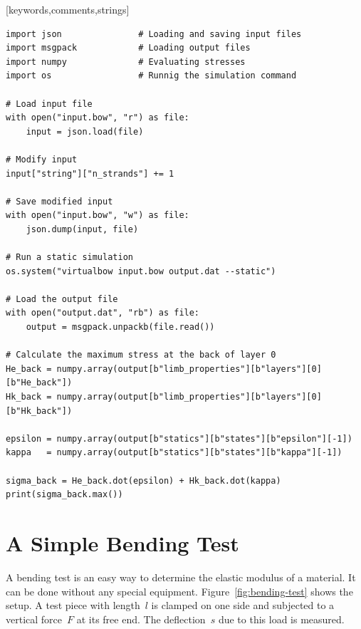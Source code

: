 \documentclass[12pt]{article}
\begin{document}

[keywords,comments,strings]

\bigskip

\begin{framed}
\begin{lstlisting}[language=mypython, style=mystyle]
import json               # Loading and saving input files
import msgpack            # Loading output files
import numpy              # Evaluating stresses
import os                 # Runnig the simulation command

# Load input file
with open("input.bow", "r") as file:
    input = json.load(file)

# Modify input
input["string"]["n_strands"] += 1

# Save modified input
with open("input.bow", "w") as file:
    json.dump(input, file)

# Run a static simulation
os.system("virtualbow input.bow output.dat --static")

# Load the output file
with open("output.dat", "rb") as file:
    output = msgpack.unpackb(file.read())

# Calculate the maximum stress at the back of layer 0
He_back = numpy.array(output[b"limb_properties"][b"layers"][0][b"He_back"])
Hk_back = numpy.array(output[b"limb_properties"][b"layers"][0][b"Hk_back"])

epsilon = numpy.array(output[b"statics"][b"states"][b"epsilon"][-1])
kappa   = numpy.array(output[b"statics"][b"states"][b"kappa"][-1])

sigma_back = He_back.dot(epsilon) + Hk_back.dot(kappa)
print(sigma_back.max())
\end{lstlisting}
\end{framed}

\newpage
\section{A Simple Bending Test}
\label{sec:bending-test}

A bending test is an easy way to determine the elastic modulus of a material. It can be done without any special equipment.
Figure~\ref{fig:bending-test} shows the setup. A test piece with length~$l$ is clamped on one side and subjected to a vertical force~$F$ at its free end.
The deflection~$s$ due to this load is measured.
\end{document}
